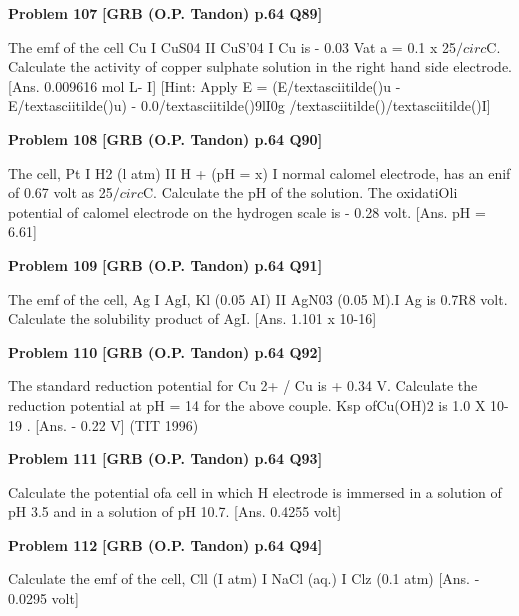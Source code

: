 \begin{problembox}
\textbf{Problem 107} \hfill \textbf{[GRB (O.P. Tandon) p.64 Q89]}
\label{q:ext-grb_all_questions-107}

The emf of the cell Cu I CuS04 II CuS'04 I Cu is - 0.03 Vat 
a = 0.1 
x 
25$/circ$C. Calculate the activity of copper sulphate solution in the 
right hand side electrode. 
[Ans. 
0.009616 mol L- I] 
[Hint: 
Apply E = (E/textasciitilde()u - E/textasciitilde()u) -
0.0/textasciitilde()9lI0g /textasciitilde()/textasciitilde()I]
\end{problembox}

\begin{problembox}
\textbf{Problem 108} \hfill \textbf{[GRB (O.P. Tandon) p.64 Q90]}
\label{q:ext-grb_all_questions-108}

The cell, 
Pt I H2 (l atm) II H + (pH = x) I 
normal calomel electrode, has an enif of 0.67 volt as 25$/circ$C. 
Calculate the pH of the solution. The oxidatiOli potential of 
calomel electrode on the hydrogen scale is - 0.28 volt. 
[Ans. 
pH = 6.61]
\end{problembox}

\begin{problembox}
\textbf{Problem 109} \hfill \textbf{[GRB (O.P. Tandon) p.64 Q91]}
\label{q:ext-grb_all_questions-109}

The emf of the cell, 
Ag I AgI, Kl (0.05 AI) II AgN03 (0.05 M).I Ag 
is 0.7R8 volt. Calculate the solubility product of AgI. 
[Ans. 
1.101 x 10-16]
\end{problembox}

\begin{problembox}
\textbf{Problem 110} \hfill \textbf{[GRB (O.P. Tandon) p.64 Q92]}
\label{q:ext-grb_all_questions-110}

The standard reduction potential for Cu 2+ / Cu is + 0.34 V. 
Calculate the reduction potential at pH = 14 for the above 
couple. Ksp ofCu(OH)2 is 1.0 X 10- 19 . 
[Ans. 
- 0.22 V] 
(TIT 1996)
\end{problembox}

\begin{problembox}
\textbf{Problem 111} \hfill \textbf{[GRB (O.P. Tandon) p.64 Q93]}
\label{q:ext-grb_all_questions-111}

Calculate the potential ofa cell in which H electrode is 
immersed in a solution of pH 3.5 and in a solution of pH 10.7. 
[Ans. 
0.4255 volt]
\end{problembox}

\begin{problembox}
\textbf{Problem 112} \hfill \textbf{[GRB (O.P. Tandon) p.64 Q94]}
\label{q:ext-grb_all_questions-112}

Calculate the emf of the cell, 
Cll (I atm) I NaCl (aq.) I Clz (0.1 atm) 
[Ans. 
- 0.0295 volt]
\end{problembox}

